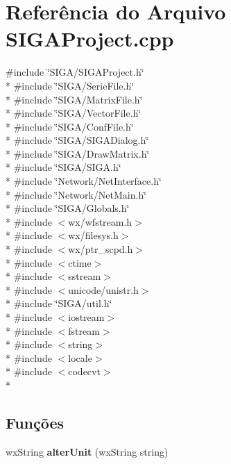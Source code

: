 \section{Referência do Arquivo S\+I\+G\+A\+Project.\+cpp}
\label{_s_i_g_a_project_8cpp}
{\ttfamily \#include \char`\"{}S\+I\+G\+A/\+S\+I\+G\+A\+Project.\+h\char`\"{}}\\*
{\ttfamily \#include \char`\"{}S\+I\+G\+A/\+Serie\+File.\+h\char`\"{}}\\*
{\ttfamily \#include \char`\"{}S\+I\+G\+A/\+Matrix\+File.\+h\char`\"{}}\\*
{\ttfamily \#include \char`\"{}S\+I\+G\+A/\+Vector\+File.\+h\char`\"{}}\\*
{\ttfamily \#include \char`\"{}S\+I\+G\+A/\+Conf\+File.\+h\char`\"{}}\\*
{\ttfamily \#include \char`\"{}S\+I\+G\+A/\+S\+I\+G\+A\+Dialog.\+h\char`\"{}}\\*
{\ttfamily \#include \char`\"{}S\+I\+G\+A/\+Draw\+Matrix.\+h\char`\"{}}\\*
{\ttfamily \#include \char`\"{}S\+I\+G\+A/\+S\+I\+G\+A.\+h\char`\"{}}\\*
{\ttfamily \#include \char`\"{}Network/\+Net\+Interface.\+h\char`\"{}}\\*
{\ttfamily \#include \char`\"{}Network/\+Net\+Main.\+h\char`\"{}}\\*
{\ttfamily \#include \char`\"{}S\+I\+G\+A/\+Globals.\+h\char`\"{}}\\*
{\ttfamily \#include $<$wx/wfstream.\+h$>$}\\*
{\ttfamily \#include $<$wx/filesys.\+h$>$}\\*
{\ttfamily \#include $<$wx/ptr\+\_\+scpd.\+h$>$}\\*
{\ttfamily \#include $<$ctime$>$}\\*
{\ttfamily \#include $<$sstream$>$}\\*
{\ttfamily \#include $<$unicode/unistr.\+h$>$}\\*
{\ttfamily \#include \char`\"{}S\+I\+G\+A/util.\+h\char`\"{}}\\*
{\ttfamily \#include $<$iostream$>$}\\*
{\ttfamily \#include $<$fstream$>$}\\*
{\ttfamily \#include $<$string$>$}\\*
{\ttfamily \#include $<$locale$>$}\\*
{\ttfamily \#include $<$codecvt$>$}\\*
\subsection*{Funções}
\begin{DoxyCompactItemize}
\item 
wx\+String {\bf alter\+Unit} (wx\+String string)
\end{DoxyCompactItemize}


